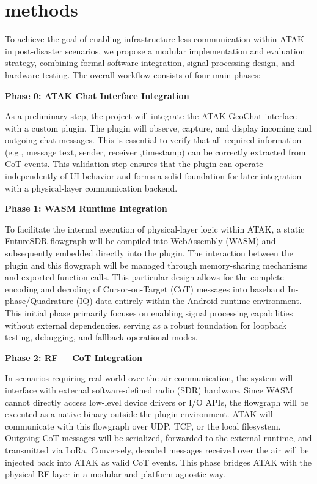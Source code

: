 \section{methods}
To achieve the goal of enabling infrastructure-less communication within ATAK in post-disaster scenarios, we propose a modular implementation and evaluation strategy, combining formal software integration, signal processing design, and hardware testing. The overall workflow consists of four main phases:

\vspace{0.5em}
\noindent\textbf{Phase 0: ATAK Chat Interface Integration}\par
As a preliminary step, the project will integrate the ATAK GeoChat interface with a custom plugin. The plugin will observe, capture, and display incoming and outgoing chat messages. This is essential to verify that all required information (e.g., message text, sender, receiver ,timestamp) can be correctly extracted from CoT events. This validation step ensures that the plugin can operate independently of UI behavior and forms a solid foundation for later integration with a physical-layer communication backend.

\vspace{0.5em}
\noindent\textbf{Phase 1: WASM Runtime Integration}\par
To facilitate the internal execution of physical-layer logic within ATAK, a static FutureSDR flowgraph will be compiled into WebAssembly (WASM) and subsequently embedded directly into the plugin. The interaction between the plugin and this flowgraph will be managed through memory-sharing mechanisms and exported function calls. This particular design allows for the complete encoding and decoding of Cursor-on-Target (CoT) messages into baseband In-phase/Quadrature (IQ) data entirely within the Android runtime environment. This initial phase primarily focuses on enabling signal processing capabilities without external dependencies, serving as a robust foundation for loopback testing, debugging, and fallback operational modes.

\vspace{0.5em}
\noindent\textbf{Phase 2: RF + CoT Integration}\par
In scenarios requiring real-world over-the-air communication, the system will interface with external software-defined radio (SDR) hardware. Since WASM cannot directly access low-level device drivers or I/O APIs, the flowgraph will be executed as a native binary outside the plugin environment. ATAK will communicate with this flowgraph over UDP, TCP, or the local filesystem. Outgoing CoT messages will be serialized, forwarded to the external runtime, and transmitted via LoRa. Conversely, decoded messages received over the air will be injected back into ATAK as valid CoT events. This phase bridges ATAK with the physical RF layer in a modular and platform-agnostic way.

